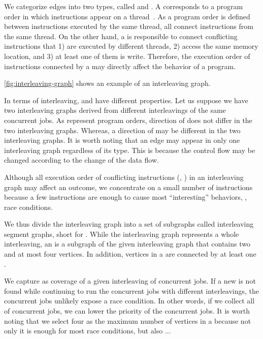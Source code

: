 We categorize edges into two types, called \immutables and \mutables.
%
A \immutable corresponds to a program order in which instructions
appear on a thread~\cite{frightening, lkmm}. As a program order is
defined between instructions executed by the same thread, all
\immutables connect instructions from the same thread.
%
On the other hand, a \mutable is responsible to connect conflicting
instructions that 1) are executed by different threads, 2) access the
same memory location, and 3) at least one of them is write.
%
Therefore, the execution order of instructions connected by a \mutable
may directly affect the behavior of a program.


\autoref{fig:interleaving-graph} shows an example of an interleaving
graph.
%


%
In terms of interleaving, \immutables and \mutables have different
properties. Let us suppose we have two interleaving graphs derived
from different interleavings of the same concurrent jobs.
%
As \immutables represent program orders, direction of \immutables does
not differ in the two interleaving graphs.
%
Whereas, a direction of \mutables may be different in the two
interleaving graphs.
%
It is worth noting that an edge may appear in only one interleaving
graph regardless of its type. This is because the control flow may be
changed according to the change of the data flow.


%
Although all execution order of conflicting instructions (\ie,
\mutables) in an interleaving graph may affect an outcome, we
concentrate on a small number of instructions because a few
instructions are enough to cause most ``interesting'' behaviors, \ie,
race conditions.

%
We thus divide the interleaving graph into a set of subgraphs called
interleaving segment graphs, short for \segments.
%
While the interleaving graph represents a whole interleaving, an
\segment is a subgraph of the given interleaving graph that contains
two \mutables and at most four vertices. In addition, vertices in a
\segment are connected by at least one \mutable.

We capture \segments as coverage of a given interleaving of concurrent
jobs.
%
If a new \segment is not found while continuing to run the concurrent
jobs with different interleavings, the concurrent jobs unlikely expose
a race condition. In other words, if we collect all \segments of
concurrent jobs, we can lower the priority of the concurrent jobs.
%
It is worth noting that we select four as the maximum number of
vertices in a \segment because not only it is enough for most race
conditions, but also \dr{}...

